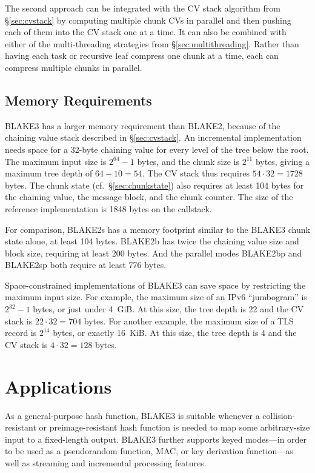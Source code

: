\documentclass[11pt,notitlepage,a4paper]{article}
\begin{document}
The second approach can be integrated with the CV stack algorithm from
\S\ref{sec:cvstack} by computing multiple chunk CVs in parallel and then
pushing each of them into the CV stack one at a time. It can also be combined
with either of the multi-threading strategies from \S\ref{sec:multithreading}.
Rather than having each task or recursive leaf compress one chunk at a time,
each can compress multiple chunks in parallel.

\subsection{Memory Requirements}\label{sec:memory}

BLAKE3 has a larger memory requirement than BLAKE2, because of the chaining
value stack described in \S\ref{sec:cvstack}. An incremental implementation
needs space for a 32-byte chaining value for every level of the tree below the
root. The maximum input size is $2^{64}-1$ bytes, and the chunk size is
$2^{11}$ bytes, giving a maximum tree depth of $64 - 10 = 54$. The CV stack
thus requires $54 \cdot 32 = 1728$ bytes. The chunk state
(cf.~\S\ref{sec:chunkstate}) also requires at least 104 bytes for the chaining
value, the message block, and the chunk counter. The size of the reference
implementation is 1848 bytes on the callstack.

For comparison, BLAKE2s has a memory footprint similar to the BLAKE3 chunk
state alone, at least 104 bytes. BLAKE2b has twice the chaining value size and
block size, requiring at least 200 bytes. And the parallel modes BLAKE2bp and
BLAKE2sp both require at least 776 bytes.

Space-constrained implementations of BLAKE3 can save space by restricting the
maximum input size. For example, the maximum size of an IPv6 ``jumbogram'' is
$2^{32}-1$ bytes, or just under 4~GiB. At this size, the tree depth is 22 and
the CV stack is $22 \cdot 32 = 704$ bytes. For another example, the maximum
size of a TLS record is $2^{14}$ bytes, or exactly 16~KiB. At this size, the
tree depth is 4 and the CV stack is $4 \cdot 32 = 128$ bytes.

\section{Applications}\label{sec:applications}

As a general-purpose hash function, BLAKE3 is suitable whenever a
collision-resistant or preimage-resistant hash function is needed to map
some arbitrary-size input to a fixed-length output.
BLAKE3 further supports keyed modes---in order to be used as a pseudorandom
function, MAC, or key derivation function---as well as streaming and
incremental processing features.
\end{document}
